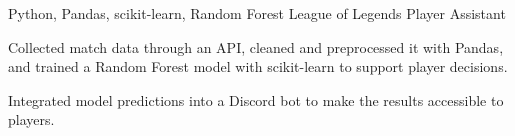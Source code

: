 
\begin{cventries}
  \cventry
    {Python, Pandas, scikit-learn, Random Forest}
    {League of Legends Player Assistant}
    {}
    {}
    {
      \begin{cvitems}
        \item {Collected match data through an API, cleaned and preprocessed it with Pandas, and trained a Random Forest model with scikit-learn to support player decisions.}
        \item {Integrated model predictions into a Discord bot to make the results accessible to players.}
      \end{cvitems}
    }
\end{cventries}
